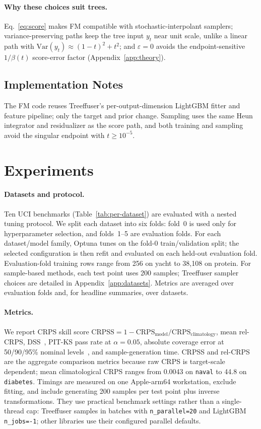 \documentclass{tpm2026}
\newcommand{\crps}{\mathrm{CRPS}}
\newcommand{\crpss}{\mathrm{CRPSS}}
\newcommand{\Var}{\mathrm{Var}}
\begin{document}
\paragraph{Why these choices suit trees.} Eq.~\eqref{eq:score} makes FM compatible with stochastic-interpolant samplers; variance-preserving paths keep the tree input $y_t$ near unit scale, unlike a linear path with $\Var(y_t)\approx(1-t)^2+t^2$; and $\varepsilon=0$ avoids the endpoint-sensitive $1/\beta(t)$ score-error factor (Appendix~\ref{app:theory}).

\subsection{Implementation Notes}\label{sec:impl}
The FM code reuses Treeffuser's per-output-dimension LightGBM fitter and feature pipeline; only the target and prior change. Sampling uses the same Heun integrator and residualizer as the score path, and both training and sampling avoid the singular endpoint with $t \geq 10^{-5}$.

\section{Experiments}\label{sec:exp}

\paragraph{Datasets and protocol.} Ten UCI benchmarks (Table~\ref{tab:per-dataset}) are evaluated with a nested tuning protocol. We split each dataset into six folds: fold~0 is used only for hyperparameter selection, and folds~1--5 are evaluation folds. For each dataset/model family, Optuna tunes on the fold-0 train/validation split; the selected configuration is then refit and evaluated on each held-out evaluation fold. Evaluation-fold training rows range from 256 on yacht to 38{,}108 on protein. For sample-based methods, each test point uses 200 samples; Treeffuser sampler choices are detailed in Appendix~\ref{app:datasets}. Metrics are averaged over evaluation folds and, for headline summaries, over datasets.

\paragraph{Metrics.} We report CRPS skill score $\crpss = 1 - \crps_{\text{model}} / \crps_{\text{climatology}}$, mean rel-CRPS, DSS~\citep{dawid1984pit}, PIT-KS pass rate at $\alpha=0.05$, absolute coverage error at 50/90/95\% nominal levels~\citep{gneiting2007crps}, and sample-generation time. CRPSS and rel-CRPS are the aggregate comparison metrics because raw CRPS is target-scale dependent; mean climatological CRPS ranges from 0.0043 on \texttt{naval} to 44.8 on \texttt{diabetes}. Timings are measured on one Apple-arm64 workstation, exclude fitting, and include generating 200 samples per test point plus inverse transformations. They use practical benchmark settings rather than a single-thread cap: Treeffuser samples in batches with \texttt{n\_parallel=20} and LightGBM \texttt{n\_jobs=-1}; other libraries use their configured parallel defaults.
\end{document}
